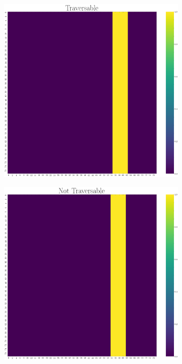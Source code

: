 \documentclass[../document.tex]{subfiles}
\begin{document}
\begin{figure}[H]
    \centering
    \begin{subfigure}[b]{0.33\textwidth}
        \includegraphics[width=\linewidth]{../img/5/custom_patches/walls_front/1-2d.png}
        \end{subfigure}   
    \begin{subfigure}[b]{0.33\textwidth}
        \includegraphics[width=\linewidth]{../img/5/custom_patches/walls_front/2-2d.png}

\end{subfigure}
\end{figure}
\end{document}
